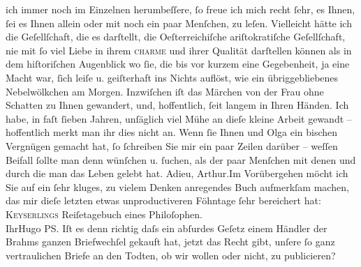 \begin{ledgroupsized}[t]{13cm}
               ich immer noch im Einzelnen herumbeſſere, ſo freue ich mich recht ſehr, es Ihnen, ſei
               es Ihnen allein oder mit noch ein paar Menſchen, zu leſen. Vielleicht hätte ich die
               Geſellſchaft, die es darſtellt, die Oeſterreichiſche  ariſtokratiſche Geſellſchaft, nie mit ſo viel Liebe in ihrem \textsc{charme} und ihrer Qualität darſtellen können als in dem
               hiſtoriſchen Augenblick wo ſie, die bis vor kurzem eine Gegebenheit, ja eine Macht
               war, ſich leiſe u. geiſterhaft ins Nichts auflöst, wie {\pb}ein übriggebliebenes Nebelwölkchen
               am Morgen.\pend
           \pstart
           Inzwiſchen iſt das Märchen von der Frau ohne
                  Schatten zu Ihnen gewandert, und, hoffentlich, ſeit langem in Ihren
               Händen.\pend
           \pstart
           Ich habe, in faſt ſieben Jahren, unſäglich viel Mühe an dieſe kleine Arbeit gewandt –
               hoffentlich merkt man ihr dies nicht an. Wenn ſie Ihnen und Olga ein bischen Vergnügen gemacht hat, ſo ſchreiben Sie mir
               ein paar Zeilen darüber – weſſen Beifall ſollte man denn wünſchen u. ſuchen, als der
               paar Menſchen mit {\pb}denen und durch
               die man das Leben gelebt hat.\pend
           \pstart
           Adieu, Arthur.\hspace*{1.5em}Im Vorübergehen möcht ich Sie auf ein
               ſehr kluges, zu vielem Denken anregendes Buch aufmerkſam machen, das mir dieſe
               letzten etwas unproductiveren Föhntage ſehr bereichert hat: \textsc{Keyserlings}{ }Reiſetagebuch eines
                  Philoſophen.{\\}Ihr\spacefill\mbox{Hugo}\pend
           \pstart
           \noindent{}PS. Iſt es denn richtig daſs ein abſurdes Geſetz einem Händler der Brahms ganzen Briefwechſel gekauft hat, jetzt das Recht
                  gibt, unſere ſo ganz vertraulichen Briefe an den Todten, ob wir wollen oder nicht,
                  zu publicieren? \pend
           
         
         \endnumbering{}\end{ledgroupsized}  \newcommand{\dateiname}{L02331}\newcommand{\titel}{Hugo Hofmannsthal an Arthur Schnitzler, 2. 11. 1919}\newcommand{\editorInnen}{Martin Anton Müller und Gerd-Hermann Susen}
      